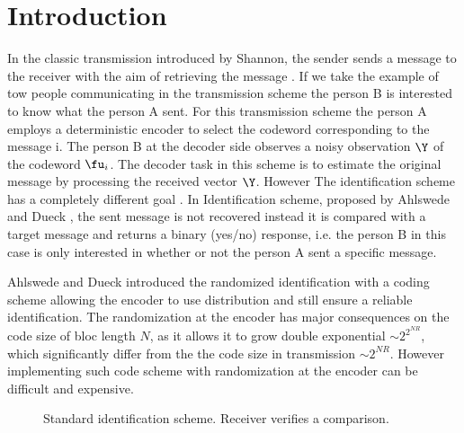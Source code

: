 \chapter{Introduction}
\label{chap:introduction}
In the classic transmission introduced by Shannon, the sender sends a message to the receiver with the aim of retrieving the message \cite{S48}. If we take the example of tow people communicating in the transmission scheme the person B is interested to know what the person A sent. For this transmission scheme the person A employs a deterministic encoder to select the codeword  corresponding to the message i. The person B at the decoder side observes a noisy observation $\Y$ of the codeword $\fu_{i}$. The decoder task in this scheme is to estimate the original message by processing the received vector $\Y$. However The identification scheme has a  completely different goal \cite{AD89,Ahlswede21_Book}. In Identification scheme, proposed by Ahlswede and Dueck \cite{AD89,Ahlswede21_Book}, the sent message is not recovered instead it is compared with a target message and returns a binary (yes/no) response, i.e. the person B in this case is only interested in whether or not the person A sent a specific message.

Ahlswede and Dueck introduced the randomized identification \cite{AD89,Ahlswede21_Book} with a coding scheme allowing the encoder to use distribution and still ensure a reliable identification. The randomization at the encoder has major consequences on the code size of bloc length $N$, as it allows it to grow double exponential $\sim 2^{2^{N R}}$, which significantly differ from the the code size in transmission $\sim 2^{N R}$. However implementing such code scheme with randomization at the encoder can be difficult and expensive.

\begin{figure}[b]
    \centering
    
    \caption{Standard identification scheme. Receiver verifies a comparison.}
    \label{Fig.ID}
\end{figure}

